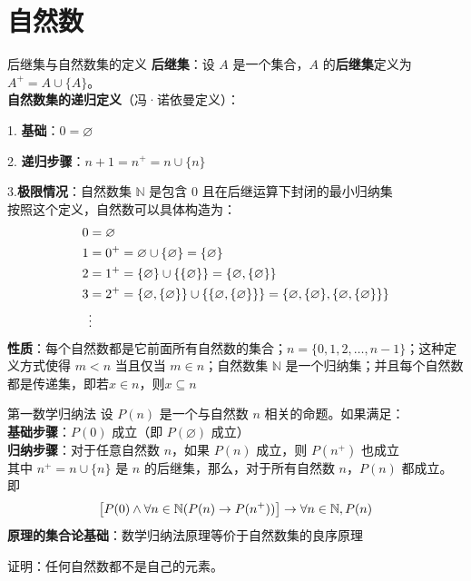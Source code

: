 \section{自然数}
\begin{definition}{后继集与自然数集的定义}{}
\textbf{后继集}：设 $A$ 是一个集合，$A$ 的\textbf{后继集}定义为 $A^{+} = A \cup \{A\}$。\\
\textbf{自然数集的递归定义}（冯·诺依曼定义）：

1. \textbf{基础}：$0 = \varnothing$

2. \textbf{递归步骤}：$n + 1 = n^{+} = n \cup \{n\}$

3.\textbf{极限情况}：自然数集 $\mathbb{N}$ 是包含 $0$ 且在后继运算下封闭的最小归纳集\\
按照这个定义，自然数可以具体构造为：\vspace{-10pt}
\begin{align*}
0 &= \varnothing \\
1 &= 0^{+} = \varnothing \cup \{\varnothing\} = \{\varnothing\} \\
2 &= 1^{+} = \{\varnothing\} \cup \{\{\varnothing\}\} = \{\varnothing, \{\varnothing\}\} \\
3 &= 2^{+} = \{\varnothing, \{\varnothing\}\} \cup \{\{\varnothing, \{\varnothing\}\}\} = \{\varnothing, \{\varnothing\}, \{\varnothing, \{\varnothing\}\}\} \\
&\vdots
\vspace{-10pt}\end{align*}
\textbf{性质}：每个自然数都是它前面所有自然数的集合；$n = \{0, 1, 2, \ldots, n-1\}$；这种定义方式使得 $m < n$ 当且仅当 $m \in n$；自然数集 $\mathbb{N}$ 是一个归纳集；并且每个自然数都是传递集，即若$x\in n$，则$x\subseteq n$
\end{definition}
\begin{definition}{第一数学归纳法}{}
    设 $P(n)$ 是一个与自然数 $n$ 相关的命题。如果满足：\\
    \textbf{基础步骤}：$P(0)$ 成立（即 $P(\varnothing)$ 成立）\\
    \textbf{归纳步骤}：对于任意自然数 $n$，如果 $P(n)$ 成立，则 $P(n^{+})$ 也成立\\
    其中 $n^{+} = n \cup \{n\}$ 是 $n$ 的后继集，那么，对于所有自然数 $n$，$P(n)$ 都成立。即\vspace{-10pt}
\[\bigl[P(0) \land \forall n \in \mathbb{N}(P(n) \rightarrow P(n^{+}))\bigr] \rightarrow \forall n \in \mathbb{N}, P(n)\vspace{-10pt}\]
\textbf{原理的集合论基础}：数学归纳法原理等价于自然数集的良序原理
\end{definition}
证明：任何自然数都不是自己的元素。


